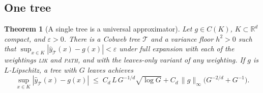 \documentclass[11pt]{article}
\newtheorem{theorem}{Theorem}
\theoremstyle{definition}
\theoremstyle{remark}
\newcommand{\R}{\mathbb{R}}
\newcommand{\T}{\mathcal{T}}
\newcommand{\hy}{\hat{y}}
\begin{document}
\subsection{One tree}

\begin{theorem}[A single tree is a universal approximator]\label{thm:single}
Let $g\in C(K)$, $K\subset\R^d$ compact, and $\varepsilon>0$.  There is a Cobweb tree $\T$
and a variance floor $h^2>0$ such that $\sup_{x\in K}|\hy_\T(x)-g(x)|<\varepsilon$ under
full expansion with each of the weightings \textsc{lik} and \textsc{path}, and with the
leaves-only variant of any weighting.  If $g$ is $L$-Lipschitz, a tree with $G$ leaves
achieves
\begin{equation}\label{eq:singlerate}
  \sup_{x\in K}|\hy_\T(x)-g(x)|\;\le\;C_d\,L\,G^{-1/d}\sqrt{\log G}
  +C_d\,\|g\|_\infty\bigl(G^{-2/d}+G^{-1}\bigr).
\end{equation}
\end{theorem}
\end{document}
